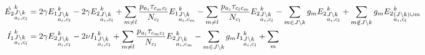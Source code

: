\begin{footnotesize}
\begin{align}
\dot{E_2}^k_{\begin{subarray}{l}J \setminus k\\ a_i, c_l \end{subarray}}
&=2 \gamma {E_1}^k_{\begin{subarray}{l}J \setminus k\\ a_i,
    c_l \end{subarray}} -2 \gamma {E_2}^k_{\begin{subarray}{l}J \setminus k\\ a_i, c_l \end{subarray}}
+\sum_{m\neq l} \frac{p_{a_i} \tau_{c_mc_l}}{N_{c_l}} {E_1}^k_{\begin{subarray}{l}J \setminus k\\ a_i,
    c_m \end{subarray}} -\sum_{m\neq l} \frac{p_{a_i}  \tau_{c_lc_m}}{N_{c_l}} {E_2}^k_{\begin{subarray}{l}J \setminus k\\ a_i,
    c_l \end{subarray}} -\sum_{m
  \in J \setminus k} g_m {E_2}^k_{\begin{subarray}{l}J \setminus k\\ a_i, c_l \end{subarray}} + \sum_{m
  \notin J \setminus k} g_m {E_2}^k_{\begin{subarray}{l} (J \setminus k) \cup m \\ a_i, c_l \end{subarray}}  \notag \\
\dot{I_1}^k_{\begin{subarray}{l}J \setminus k\\ a_i, c_l \end{subarray}} &=2 \gamma {E_2}^k_{\begin{subarray}{l}J \setminus k\\ a_i, c_l \end{subarray}}
-2 \nu {I_1}^k_{\begin{subarray}{l}J \setminus k\\ a_i,
    c_l \end{subarray}} + \sum_{m\neq l} \frac{p_{a_i} \tau_{c_mc_l}}{N_{c_l}} {E_2}^k_{\begin{subarray}{l}J \setminus k\\ a_i,
    c_m \end{subarray}}  -\sum_{m
  \in J \setminus k} g_m {I_1}^k_{\begin{subarray}{l}J \setminus k\\ a_i, c_l \end{subarray}} + \sum_{m
}
\end{align}
\end{footnotesize}

